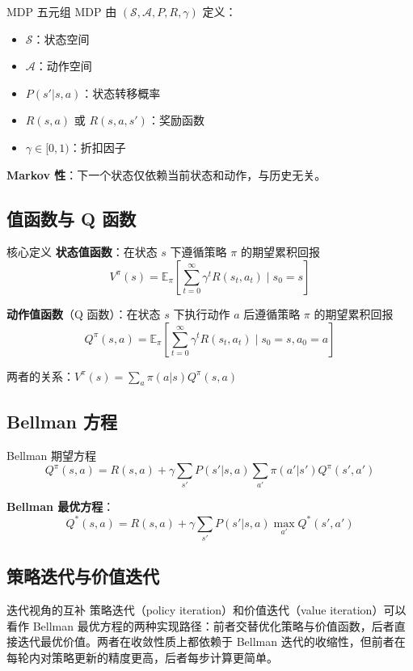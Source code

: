 \documentclass[a4paper]{article}
\begin{document}
\begin{importantbox}{MDP 五元组}
MDP 由 $(\mathcal{S}, \mathcal{A}, P, R, \gamma)$ 定义：
\begin{itemize}
    \item $\mathcal{S}$：状态空间
    \item $\mathcal{A}$：动作空间
    \item $P(s' | s, a)$：状态转移概率
    \item $R(s, a)$ 或 $R(s, a, s')$：奖励函数
    \item $\gamma \in [0, 1)$：折扣因子
\end{itemize}
\textbf{Markov 性}：下一个状态仅依赖当前状态和动作，与历史无关。
\end{importantbox}

\subsection{值函数与 Q 函数}

\begin{importantbox}{核心定义}
\textbf{状态值函数}：在状态 $s$ 下遵循策略 $\pi$ 的期望累积回报
$$V^\pi(s) = \mathbb{E}_\pi\left[\sum_{t=0}^{\infty} \gamma^t R(s_t, a_t) \mid s_0 = s\right]$$

\textbf{动作值函数}（Q 函数）：在状态 $s$ 下执行动作 $a$ 后遵循策略 $\pi$ 的期望累积回报
$$Q^\pi(s, a) = \mathbb{E}_\pi\left[\sum_{t=0}^{\infty} \gamma^t R(s_t, a_t) \mid s_0 = s, a_0 = a\right]$$

两者的关系：$V^\pi(s) = \sum_a \pi(a|s) Q^\pi(s, a)$
\end{importantbox}

\subsection{Bellman 方程}

\begin{importantbox}{Bellman 期望方程}
$$Q^\pi(s, a) = R(s, a) + \gamma \sum_{s'} P(s'|s,a) \sum_{a'} \pi(a'|s') Q^\pi(s', a')$$

\textbf{Bellman 最优方程}：
$$Q^*(s, a) = R(s, a) + \gamma \sum_{s'} P(s'|s,a) \max_{a'} Q^*(s', a')$$
\end{importantbox}

\subsection{策略迭代与价值迭代}

\begin{knowledgebox}{迭代视角的互补}
策略迭代（policy iteration）和价值迭代（value iteration）可以看作 Bellman 最优方程的两种实现路径：前者交替优化策略与价值函数，后者直接迭代最优价值。两者在收敛性质上都依赖于 Bellman 迭代的收缩性，但前者在每轮内对策略更新的精度更高，后者每步计算更简单。
\end{knowledgebox}
\end{document}
